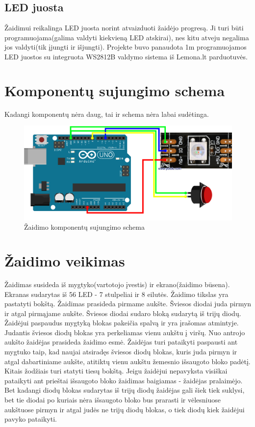 \documentclass{VUMIFPSkursinis}
\begin{document}
  \subsection{LED juosta}

    Žaidimui reikalinga LED juosta norint atvaizduoti žaidėjo progresą. Ji turi būti
    programuojama(galima valdyti kiekvieną LED atskirai),
    nes kitu atveju negalima jos valdyti(tik įjungti ir išjungti).
    Projekte buvo panaudota 1m programuojamos LED juostos su integruota WS2812B valdymo sistema iš
    Lemona.lt parduotuvės.


\section{Komponentų sujungimo schema}

  Kadangi komponentų nėra daug, tai ir schema nėra labai sudėtinga.
  \begin{figure}[H]
    \centering
    \includegraphics[scale=1]{img/schematic}
    \caption{Žaidimo komponentų sujungimo schema}
    \label{img:schema}
  \end{figure}

\section{Žaidimo veikimas}

  Žaidimas susideda iš mygtyko(vartotojo įvestis) ir ekrano(žaidimo būsena).
  Ekranas sudarytas iš 56 LED - 7 stulpeliai ir 8 eilutės.
  Žaidimo tikslas yra pastatyti bokštą.
  Žaidimas prasideda pirmame aukšte. Šviesos diodai juda pirmyn ir atgal pirmąjame aukšte.
  Šviesos diodai sudaro bloką sudarytą iš trijų diodų. Žaidėjui paspaudus mygtyką blokas
  pakeičia spalvą ir yra įrašomas atmintyje. Judantis šviesos diodų blokas yra perkeliamas vienu
  aukštu į viršų. Nuo antrojo aukšto žaidėjas prasideda žaidimo esmė. Žaidėjas turi
  pataikyti paspausti ant mygtuko taip, kad naujai atsiradęs šviesos diodų blokas,
  kuris juda pirmyn ir atgal dabartiniame aukšte, atitiktų vienu aukštu žemesnio išsaugoto bloko padėtį.
  Kitais žodžiais turi statyti tiesų bokštą. Jeigu žaidėjui nepavyksta visiškai pataikyti
  ant prieštai išsaugoto bloko žaidimas baigiamas - žaidėjas pralaimėjo. Bet kadangi diodų blokas sudarytas
  iš trijų diodų žaidėjas gali šiek tiek suklysi, bet tie diodai po kuriais nėra išsaugoto bloko bus prarasti
  ir vėlesniuose aukštuose pirmyn ir atgal judės ne trijų diodų blokas,
  o tiek diodų kiek žaidėjui pavyko pataikyti.
\end{document}
